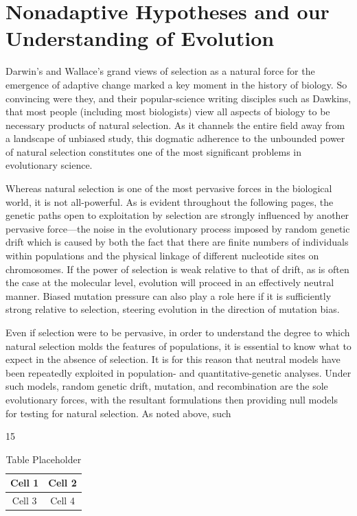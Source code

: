 \documentclass{article}
\begin{document}
\section{Nonadaptive Hypotheses and our Understanding of Evolution}
Darwin’s and Wallace’s grand views of selection as a natural force for the emergence of adaptive change marked a key moment in the history of biology. So convincing were they, and their popular-science writing disciples such as Dawkins, that most people (including most biologists) view all aspects of biology to be necessary products of natural selection. As it channels the entire field away from a landscape of unbiased study, this dogmatic adherence to the unbounded power of natural selection constitutes one of the most significant problems in evolutionary science.

Whereas natural selection is one of the most pervasive forces in the biological world, it is not all-powerful. As is evident throughout the following pages, the genetic paths open to exploitation by selection are strongly influenced by another pervasive force—the noise in the evolutionary process imposed by random genetic drift which is caused by both the fact that there are finite numbers of individuals within populations and the physical linkage of different nucleotide sites on chromosomes. If the power of selection is weak relative to that of drift, as is often the case at the molecular level, evolution will proceed in an effectively neutral manner. Biased mutation pressure can also play a role here if it is sufficiently strong relative to selection, steering evolution in the direction of mutation bias.

Even if selection were to be pervasive, in order to understand the degree to which natural selection molds the features of populations, it is essential to know what to expect in the absence of selection. It is for this reason that neutral models have been repeatedly exploited in population- and quantitative-genetic analyses. Under such models, random genetic drift, mutation, and recombination are the sole evolutionary forces, with the resultant formulations then providing null models for testing for natural selection. As noted above, such

15

\begin{table}[h]
\centering
\begin{tabular}{|c|c|}
\hline
Cell 1 & Cell 2 \\
\hline
Cell 3 & Cell 4 \\
\hline
\end{tabular}
\caption{Table Placeholder}
\end{table}
\end{document}

